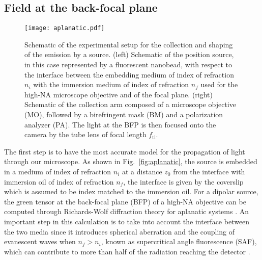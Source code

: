 \documentclass[reprint,aps,pra,superscriptaddress,
amsmath,amssymb]{revtex4-1}
\begin{document}
\subsection{Field at the back-focal plane}

\begin{figure*}
  \centering
  \texttt{[image: aplanatic.pdf]}
  \caption{\label{fig:setup} Schematic of the experimental setup for the 
  collection and shaping of the emission by a source. (left) Schematic of the position 
  source, in this case represented by a fluorescent nanobead, with respect
  to the interface between the embedding medium of index of refraction
  $n_i$ with the immersion medium of index of refraction $n_f$ used for 
  the high-NA microscope objective and of the focal plane. (right) 
  Schematic of the collection arm composed of a microscope objective (MO), 
  followed by a birefringent mask (BM) and a polarization analyzer (PA). 
  The light at the BFP is then focused onto the camera by the tube lens 
  of focal length $f_\text{tl}$. }
\end{figure*}

The first step is to have the most accurate model for the propagation 
of light through our microscope. As shown in Fig.~\ref{fig:aplanatic}, 
the source is embedded in a medium of index of refraction $n_i$ at a 
distance $z_0$ from the interface with immersion oil of index of 
refraction $n_f$, the interface is given by the coverslip which is assumed
to be index matched to the immersion oil. For a dipolar source, the green 
tensor at the back-focal plane (BFP) of a high-NA objective can be 
computed through Richards-Wolf diffraction 
theory for aplanatic systems \cite{richards1959electromagnetic,
novotny2006principles}. An important step in this calculation is to  
take into account the interface between the two media since it introduces 
spherical aberration and the coupling of evanescent waves when $n_f > n_i$,
known as supercritical angle fluorescence (SAF), 
which  can contribute to more than 
half of the radiation reaching the detector \cite{hellen1987fluorescence,
axelrod2001total,axelrod2013evanescent}.
\end{document}
